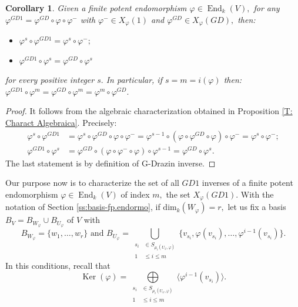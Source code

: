 \documentclass[10pt,a4paper]{amsart}
\newtheorem{cor}[defn]{Corollary}
\theoremstyle{plain}
\theoremstyle{remark}
\numberwithin{equation}{section} \numberwithin{defn}{section}
\newcommand\ed{\operatorname{End}}
\newcommand\Ker{\operatorname{Ker}}
\newcommand{\f}{\varphi}
\begin{document}
\begin{cor}\label{C: GD contenidas GD1}
Given a finite potent endomorphism $\f\in \ed_k(V),$ for any $\f^{GD1}=\f^{GD}\circ \f \circ \f^{-}$ with $\f^-\in X_{\f}(1)$ and $\f^{GD}\in X_{\f}(GD),$ then:
\begin{itemize}
\item $\f^s\circ \f^{GD1}=\f^s\circ \f^-;$\smallskip
\item $\f^{GD1}\circ \f^s=\f^{GD}\circ \f^s$
\end{itemize}
for every positive integer $s.$ In particular, if $s=m=i(\f)$ then: $\f^{GD1}\circ \f^m=\f^{GD}\circ \f^m=\f^m\circ \f^{GD}.$
\end{cor}
\begin{proof}
It follows from the algebraic characterization obtained in Proposition \ref{T: Charact Algebraica}. Precisely: 
\begin{align*}
\f^s\circ \f^{GD1}&=\f^s\circ \f^{GD}\circ \f \circ \f^-=\f^{s-1}\circ (\f \circ \f^{GD}\circ \f)\circ \f^-=\f^{s}\circ \f^-;\\
\f^{GD1}\circ\f^s &=\f^{GD}\circ (\f \circ \f^-\circ \f)\circ \f^{s-1}=\f^{GD}\circ \f^s.
\end{align*}
The last statement is by definition of G-Drazin inverse.
\end{proof}



Our purpose now is to characterize the set of all $GD1$ inverses of a finite potent endomorphism $\f \in \ed_k(V)$ of index $m,$ the set $X_{\f}(GD1).$ With the notation of Section \ref{ss:basis-fp.endormo}, if $\mathrm{dim}_k(W_{\f})=r,$ let us fix a basis $B_V=B_{W_{\f}}\cup B_{U_{\f}}$ of $V$ with $$B_{W_{\f}}=\{w_1,\dots,w_r\} \text{ and }  B_{U_\varphi} =  \underset {\begin{aligned} s_i &\in S_{{\mu}_i (U_\varphi, \varphi)} \\ 1 &\leq i \leq m \end{aligned}} {\bigcup} \{{ {v_{s_i}}}, \varphi ({{ v_{s_i}}}), \dots , \varphi^{i-1} ({ {v_{s_i}}})\}.$$ In this conditions, recall that \begin{equation}\label{eq: GenNucleo}
\Ker( \varphi )=  \underset {\begin{aligned} s_i &\in S_{{\mu}_i (U_\varphi, \varphi)} \\ 1 &\leq i \leq m \end{aligned}} {\bigoplus} \langle \varphi^{i-1} ({ {v_{s_i}}}) \rangle.
\end{equation}
\end{document}
